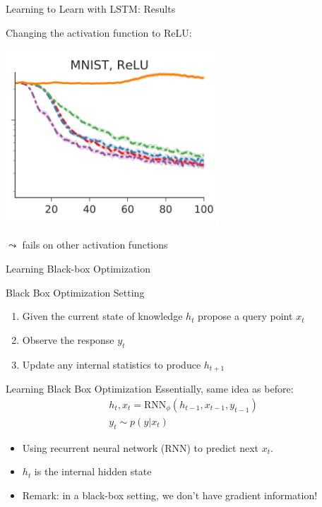 \begin{frame}[c]{Learning to Learn with LSTM: Results\newline {}}

Changing the activation function to ReLU:
\smallskip

\centering
\includegraphics[width=0.6\textwidth]{images/l2l_mnist_relu}

$\leadsto$ fails on other activation functions

\end{frame}
\begin{frame}[c]{Learning Black-box Optimization~}

\begin{block}{Black Box Optimization Setting}
\begin{enumerate}
\item Given the current state of knowledge $h_t$ propose a query point $x_t$
\item Observe the response $y_t$
\item Update any internal statistics to produce $h_{t+1}$
\end{enumerate}
\end{block}

\pause

\begin{block}{Learning Black Box Optimization}
Essentially, same idea as before:
\begin{eqnarray}
h_t, x_t = \text{RNN}_\phi(h_{t-1}, x_{t-1}, y_{t-1}) \nonumber \\
y_t \sim p(y|x_t)\nonumber
\end{eqnarray}

\begin{itemize}
\item Using recurrent neural network (RNN) to predict next $x_t$.
\item $h_t$ is the internal hidden state 
\pause
\item \alert{Remark:} in a black-box setting, we don't have gradient information!
\end{itemize}

\end{block}



\end{frame}
